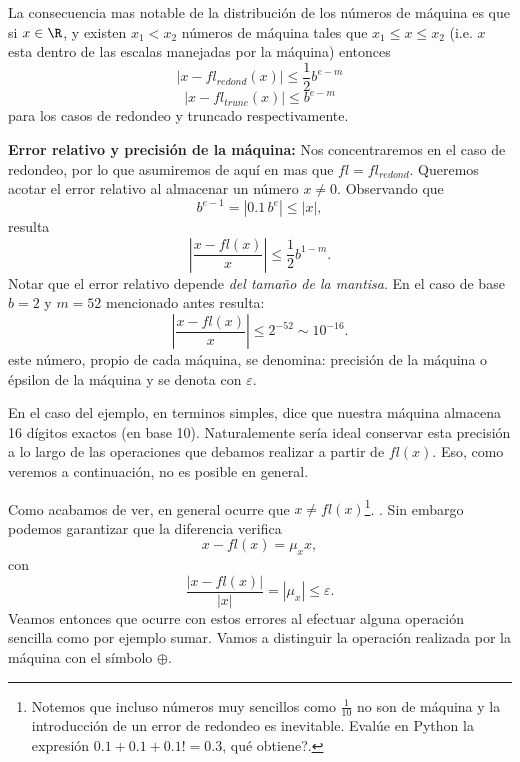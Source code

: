 La consecuencia mas notable de la distribución de los números de máquina es que si $x\in \R$, y existen $x_1<x_2$ números de máquina tales que $x_1\le x\le x_2$ (i.e. $x$ esta dentro de las escalas manejadas por la máquina) entonces
$$
|x-fl_{redond}(x)|\le \frac12 b^{e-m}
$$
$$
|x-fl_{trunc}(x)|\le b^{e-m}
$$
para los casos de redondeo y truncado respectivamente.
\begin{tcolorbox}{\bf Error relativo y precisión de la máquina:}
Nos concentraremos en el caso de redondeo, por lo que asumiremos de aquí en mas que  $fl=fl_{redond}$. Queremos acotar el error relativo al almacenar un número $x\neq 0$.  Observando que
$$b^{e-1}=|0.1\, b^{e}|\le  |x|,$$
resulta
$$
|\frac{x-fl(x)}{x}|\le \frac12 b^{1-m}.
$$
Notar que el error relativo depende \emph{del tamaño de la mantisa}. En el caso de base $b=2$ y $m=52$ mencionado antes resulta:
$$
|\frac{x-fl(x)}{x}|\le  2^{-52}\sim 10^{-16}.
$$
este número, propio de cada máquina, se denomina: precisión de la máquina o épsilon de la máquina y se denota con $\varepsilon$.

En el caso del ejemplo, en terminos simples, dice que nuestra máquina almacena 16 dígitos exactos (en base 10). Naturalemente sería ideal conservar esta precisión a lo largo de las  operaciones que debamos realizar a partir de  $fl(x)$. Eso, como veremos a continuación,  no es posible en general.
\end{tcolorbox}

Como acabamos de ver, en general ocurre que
$x\neq fl(x)$\footnote{Notemos que incluso números muy sencillos como $\frac{1}{10}$ no son de máquina y la introducción de un error de redondeo es inevitable. Evalúe en Python la expresión
$0.1+0.1+0.1!=0.3$, qué obtiene?.}. . Sin embargo podemos garantizar que la diferencia verifica
$$
x-fl(x)=\mu_x x,
$$
con
$$
\frac{|x-fl(x)|}{|x|} =|\mu_x|\le \varepsilon.
$$
Veamos entonces que ocurre con estos errores al efectuar alguna operación
sencilla como por ejemplo sumar. Vamos a distinguir la operación realizada por la máquina con el símbolo $\oplus$.

